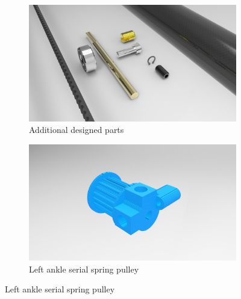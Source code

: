\begin{figure}[ht!]
    \ContinuedFloat %
    \begin{subfigure}[b]{0.49\textwidth}
        \includegraphics[width=\textwidth]{figures/legs_parts.jpg}
        \caption{Additional designed parts}
        \label{fig:mouse}
    \end{subfigure}
    \begin{subfigure}[b]{0.49\textwidth}
        \includegraphics[width=\textwidth]{figures/legs_pulley.jpg}
        \caption{Left ankle serial spring pulley}
        \label{fig:serial_spring_pulley}
    \end{subfigure}
\end{figure}    

